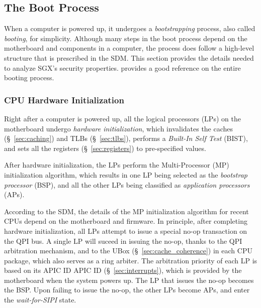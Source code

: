 \subsection{The Boot Process}
\label{sec:booting}

When a computer is powered up, it undergoes a \textit{bootstrapping} process,
also called \textit{booting}, for simplicity. Although many steps in the boot
process depend on the motherboard and components in a computer, the process
does follow a high-level structure that is prescribed in the SDM. This section
provides the details needed to analyze SGX's security properties.
\cite{intel2010booting} provides a good reference on the entire booting
process.

\subsubsection{CPU Hardware Initialization}
\label{sec:cpu_init}


Right after a computer is powered up, all the logical processors (LPs) on the
motherboard undergo \textit{hardware initialization}, which invalidates the
caches (\S~\ref{sec:caching}) and TLBs (\S~\ref{sec:tlbs}), performs a
\textit{Built-In Self Test} (BIST), and sets all the registers
(\S~\ref{sec:registers}) to pre-specified values.


After hardware initialization, the LPs perform the Multi-Processor (MP)
initialization algorithm, which results in one LP being selected as the
\textit{bootstrap processor} (BSP), and all the other LPs being classified as
\textit{application processors} (APs).

According to the SDM, the details of the MP initialization algorithm for recent
CPUs depend on the motherboard and firmware. In principle, after completing
hardware initialization, all LPs attempt to issue a special no-op transaction
on the QPI bus. A single LP will suceed in issuing the no-op, thanks to
the QPI arbitration mechanism, and to the UBox (\S~\ref{sec:cache_coherence})
in each CPU package, which also serves as a ring arbiter. The arbitration
priority of each LP is based on its APIC ID APIC ID (\S~\ref{sec:interrupts}),
which is provided by the motherboard when the system powers up. The LP that
issues the no-op becomes the BSP. Upon failing to issue the no-op, the other
LPs become APs, and enter the \textit{wait-for-SIPI} state.

